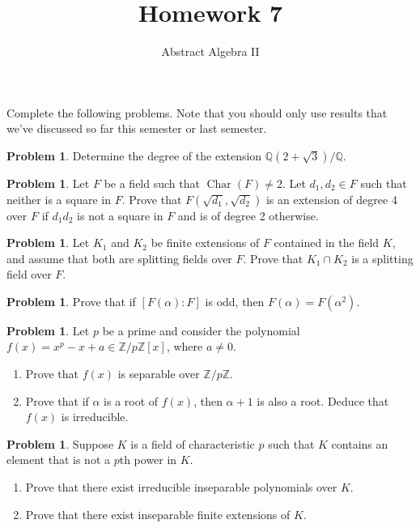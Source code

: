 \documentclass[11pt]{scrartcl}
\theoremstyle{definition}
\newtheorem{problem}[theorem]{Problem}
\DeclareMathOperator{\Char}{Char}
\begin{document}
\title{Homework 7}
\subtitle{Abstract Algebra II}
\date{}

\maketitle
\thispagestyle{fancy}

Complete the following problems. Note that you should only use results that we've discussed so far this semester or last semester.

\begin{problem}
Determine the degree of the extension $\mathbb{Q}(2+\sqrt{3})/\mathbb{Q}$.
\end{problem}

\begin{problem}
Let $F$ be a field such that $\Char(F)\neq 2$.  Let $d_1,d_2\in F$ such that neither is a square in $F$. Prove that $F(\sqrt{d_1},\sqrt{d_2})$ is an extension of degree 4 over $F$ if $d_1d_2$ is not a square in $F$ and is of degree 2 otherwise.
\end{problem}

\begin{problem}
Let $K_1$ and $K_2$ be finite extensions of $F$ contained in the field $K$, and assume that both are splitting fields over $F$. Prove that $K_1\cap K_2$ is a splitting field over $F$.
\end{problem}

\begin{problem}
Prove that if $[F(\alpha):F]$ is odd, then $F(\alpha)=F(\alpha^2)$.
\end{problem}

\begin{problem}
Let $p$ be a prime and consider the polynomial $f(x)=x^p-x+a\in \mathbb{Z}/p\mathbb{Z}[x]$, where $a\neq 0$. 
\begin{enumerate}[label=\rm{(\alph*)}]
\item Prove that $f(x)$ is separable over $\mathbb{Z}/p\mathbb{Z}$.
\item Prove that if $\alpha$ is a root of $f(x)$, then $\alpha+1$ is also a root.  Deduce that $f(x)$ is irreducible.
\end{enumerate}
\end{problem}

\begin{problem}
Suppose $K$ is a field of characteristic $p$ such that $K$ contains an element that is not a $p$th power in $K$. 
\begin{enumerate}[label=\rm{(\alph*)}]
\item Prove that there exist irreducible inseparable polynomials over $K$.
\item Prove that there exist inseparable finite extensions of $K$.
\end{enumerate}
\end{problem}
\end{document}
